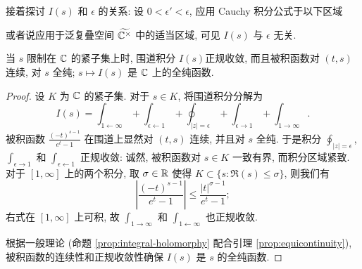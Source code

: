 接着探讨 $I(s)$ 和 $\epsilon$ 的关系: 设 $0 < \epsilon' < \epsilon$, 应用 Cauchy 积分公式于以下区域
\begin{center}\end{center}
或者说应用于泛复叠空间 $\widetilde{\mathbb{C}^\times}$ 中的适当区域, 可见 $I(s)$ 与 $\epsilon$ 无关.

\begin{lemma}\label{prop:Is-holomorphy}
	当 $s$ 限制在 $\mathbb{C}$ 的紧子集上时, 围道积分 $I(s)$正规收敛, 而且被积函数对 $(t,s)$ 连续, 对 $s$ 全纯; $s \mapsto I(s)$ 是 $\mathbb{C}$ 上的全纯函数.
\end{lemma}
\begin{proof}
	设 $K$ 为 $\mathbb{C}$ 的紧子集. 对于 $s \in K$, 将围道积分分解为
	\[ I(s) = \int_{1 \leftarrow \infty} + \int_{\epsilon \leftarrow 1} + \oint_{|z|=\epsilon} + \int_{\epsilon \to 1} + \int_{1 \to \infty}. \]
	被积函数 $\frac{(-t)^{s-1}}{e^t - 1}$ 在围道上显然对 $(t,s)$ 连续, 并且对 $s$ 全纯. 于是积分 $\oint_{|z| = \epsilon}$, $\int_{\epsilon \to 1}$ 和 $\int_{\epsilon \leftarrow 1}$ 正规收敛: 诚然, 被积函数对 $s \in K$ 一致有界, 而积分区域紧致. 对于 $[1, \infty]$ 上的两个积分, 取 $\sigma \in \mathbb{R}$ 使得 $K \subset \{s: \Re(s) \leq \sigma \}$, 则我们有
	\[ \left| \frac{(-t)^{s-1}}{e^t - 1} \right| \leq \frac{|t|^{\sigma - 1}}{e^t - 1}; \]
	右式在 $[1, \infty]$ 上可积, 故 $\int_{1 \to \infty}$ 和 $\int_{1 \leftarrow \infty}$ 也正规收敛.

	根据一般理论 (命题 \ref{prop:integral-holomorphy} 配合引理 \ref{prop:equicontinuity}), 被积函数的连续性和正规收敛性确保 $I(s)$ 是 $s$ 的全纯函数.
\end{proof}

